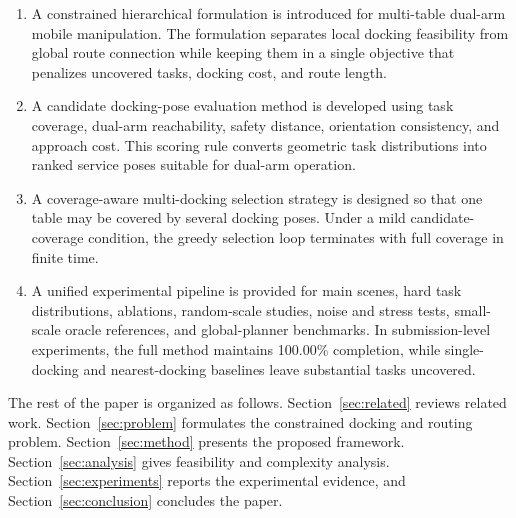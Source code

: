\begin{enumerate}
    \item A constrained hierarchical formulation is introduced for multi-table dual-arm mobile manipulation. The formulation separates local docking feasibility from global route connection while keeping them in a single objective that penalizes uncovered tasks, docking cost, and route length.
    \item A candidate docking-pose evaluation method is developed using task coverage, dual-arm reachability, safety distance, orientation consistency, and approach cost. This scoring rule converts geometric task distributions into ranked service poses suitable for dual-arm operation.
    \item A coverage-aware multi-docking selection strategy is designed so that one table may be covered by several docking poses. Under a mild candidate-coverage condition, the greedy selection loop terminates with full coverage in finite time.
    \item A unified experimental pipeline is provided for main scenes, hard task distributions, ablations, random-scale studies, noise and stress tests, small-scale oracle references, and global-planner benchmarks. In submission-level experiments, the full method maintains 100.00\% completion, while single-docking and nearest-docking baselines leave substantial tasks uncovered.
\end{enumerate}

The rest of the paper is organized as follows. Section~\ref{sec:related} reviews related work. Section~\ref{sec:problem} formulates the constrained docking and routing problem. Section~\ref{sec:method} presents the proposed framework. Section~\ref{sec:analysis} gives feasibility and complexity analysis. Section~\ref{sec:experiments} reports the experimental evidence, and Section~\ref{sec:conclusion} concludes the paper.
